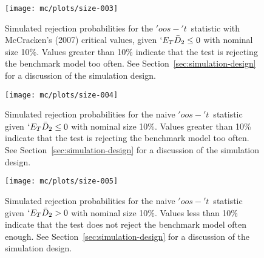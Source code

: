 \documentclass[11pt]{article}
\newcommand{\E}{`E}
\newcommand{\oost}{\ensuremath{'oos-'t}}
\begin{document}
\begin{figure}
  \centering
  \texttt{[image: mc/plots/size-003]}
   \caption{Simulated rejection probabilities for the \oost\ statistic
     with McCracken's (2007) critical values, given
     $\E_T \bar{D}_2 \leq 0$ with nominal size 10\%.  Values greater
     than 10\% indicate that the test is rejecting the benchmark model
     too often.  See Section~\ref{sec:simulation-design} for a
   discussion of the simulation design.}
  \label{fig:mccracken}
\end{figure}

\begin{figure}
  \centering
  \texttt{[image: mc/plots/size-004]}  
  \caption{Simulated rejection probabilities for the naive \oost\
    statistic given $\E_T
    \bar{D}_2 \leq 0$ with nominal size 10\%.  Values greater than
    10\% indicate that the test is rejecting the benchmark model too
    often.  See Section~\ref{sec:simulation-design} for a discussion of
    the simulation design.}
  \label{fig:ttest-size}
\end{figure}

\begin{figure}
  \centering
  \texttt{[image: mc/plots/size-005]}
  \caption{Simulated rejection probabilities for the naive \oost\
    statistic given $\E_T \bar{D}_2 > 0$ with nominal size 10\%.
    Values less than 10\% indicate that the test does not reject the
    benchmark model often enough.  See
    Section~\ref{sec:simulation-design} for a discussion of the
    simulation design.}
  \label{fig:ttest-power}
\end{figure}
\end{document}
